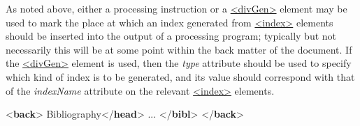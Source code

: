 As noted above, either a processing instruction or a \hyperref[TEI.divGen]{<divGen>} element may be used to mark the place at which an index generated from \hyperref[TEI.index]{<index>} elements should be inserted into the output of a processing program; typically but not necessarily this will be at some point within the back matter of the document. If the \hyperref[TEI.divGen]{<divGen>} element is used, then the {\itshape type} attribute should be used to specify which kind of index is to be generated, and its value should correspond with that of the {\itshape indexName} attribute on the relevant \hyperref[TEI.index]{<index>} elements. \par\bgroup{}\exampleFont \begin{shaded}\noindent\mbox{}{<\textbf{back}>}\mbox{}\newline 
{}\mbox{}\newline 
\hspace*{1em}Bibliography{</\textbf{head}>}\mbox{}\newline 
\hspace*{1em}\mbox{}\newline 
\hspace*{1em}\hspace*{1em} ... {</\textbf{bibl}>}\mbox{}\newline 
\hspace*{1em}\mbox{}\newline 
{}\mbox{}\newline 
{}\mbox{}\newline 
{}\mbox{}\newline 
{</\textbf{back}>}\end{shaded}\egroup\par \par
